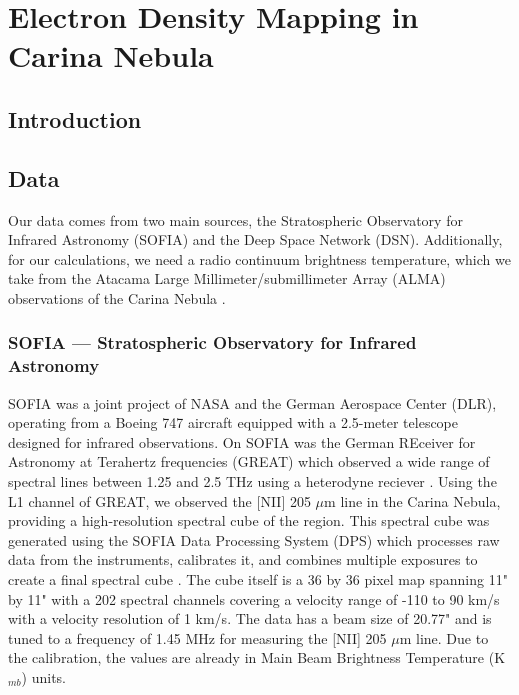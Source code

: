 \chapter[Electron Density Mapping in Carina Nebula]{Electron Density Mapping in Carina Nebula}
\label{ch:carina}
\section{Introduction}
\section{Data}
Our data comes from two main sources, the Stratospheric Observatory for Infrared Astronomy (SOFIA) and the Deep Space Network (DSN).
Additionally, for our calculations, we need a radio continuum brightness temperature, which we take from the Atacama Large Millimeter/submillimeter Array (ALMA) observations of the Carina Nebula \citep{Rebolledo_2021}.

\subsection{SOFIA --- Stratospheric Observatory for Infrared Astronomy}
SOFIA was a joint project of NASA and the German Aerospace Center (DLR), operating from a Boeing 747 aircraft equipped with a 2.5-meter telescope designed for infrared observations.
On SOFIA was the German REceiver for Astronomy at Terahertz frequencies (GREAT) which observed a wide range of spectral lines between 1.25 and 2.5 THz using a heterodyne reciever \citep{heyminck2012great}.
Using the L1 channel of GREAT, we observed the [NII] 205 $\mu$m line in the Carina Nebula, providing a high-resolution spectral cube of the region.
This spectral cube was generated using the SOFIA Data Processing System (DPS) which processes raw data from the instruments, calibrates it, and combines multiple exposures to create a final spectral cube \citep{shuping2014overview}.
The cube itself is a 36 by 36 pixel map spanning 11" by 11" with a 202 spectral channels covering a velocity range of -110 to 90 km/s with a velocity resolution of 1 km/s.
The data has a beam size of 20.77" and is tuned to a frequency of 1.45 MHz for measuring the [NII] 205 $\mu$m line.
Due to the calibration, the values are already in Main Beam Brightness Temperature (K$_{mb}$) units.

